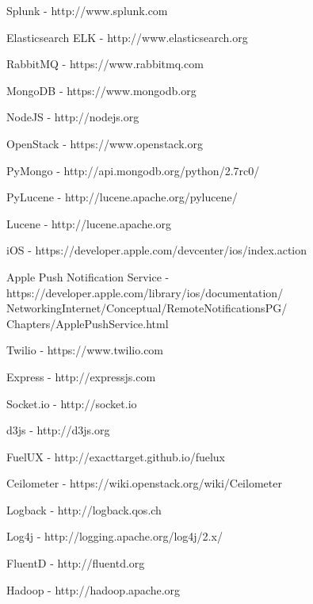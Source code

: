\documentclass[10pt, a4paper, conference, compsocconf]{IEEEtran}
\begin{document}
%
%
%
\begin{thebibliography}{1}

    Splunk - http://www.splunk.com

    Elasticsearch ELK - http://www.elasticsearch.org

    RabbitMQ - https://www.rabbitmq.com

    MongoDB - https://www.mongodb.org

    NodeJS - http://nodejs.org

    OpenStack - https://www.openstack.org

    PyMongo - http://api.mongodb.org/python/2.7rc0/

    PyLucene - http://lucene.apache.org/pylucene/

    Lucene - http://lucene.apache.org

    iOS - https://developer.apple.com/devcenter/ios/index.action

    Apple Push Notification Service -
    https://developer.apple.com/library/ios/documentation/
    NetworkingInternet/Conceptual/RemoteNotificationsPG/
    Chapters/ApplePushService.html

    Twilio - https://www.twilio.com

    Express - http://expressjs.com

    Socket.io - http://socket.io

    d3js - http://d3js.org

    FuelUX - http://exacttarget.github.io/fuelux

    Ceilometer - https://wiki.openstack.org/wiki/Ceilometer

    Logback - http://logback.qos.ch

    Log4j - http://logging.apache.org/log4j/2.x/

    FluentD - http://fluentd.org

    Hadoop - http://hadoop.apache.org

\end{thebibliography}

\end{document}
